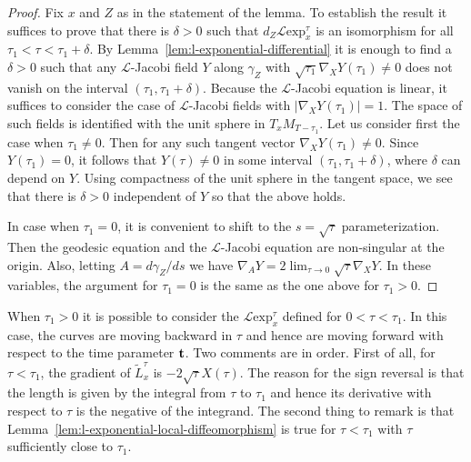 \begin{proof}
Fix $x$ and $Z$ as in the statement of the lemma. To establish the result it
suffices to prove that there is $\delta>0$ such that $d_Z{\mathcal L}\mathrm{exp}_x^{\tau}$ is an isomorphism for all $\tau_1<\tau<\tau_1+\delta$. By
Lemma~\ref{lem:l-exponential-differential} it is enough to find a $\delta>0$ such that any ${\mathcal
L}$-Jacobi field $Y$ along
 $\gamma_Z$ with $\sqrt{\tau_1}\nabla_XY(\tau_1)\not= 0$ does
 not vanish on the interval $(\tau_1,\tau_1+\delta)$.
 Because the ${\mathcal L}$-Jacobi equation is linear, it suffices to consider the
 case of ${\mathcal L}$-Jacobi fields with
 $|\nabla_XY(\tau_1)|=1$. The space of such fields is identified with the
 unit sphere in $T_xM_{T-\tau_1}$.
 Let us consider first the case when $\tau_1\not= 0$. Then for any
 such tangent vector $\nabla_XY(\tau_1)\not=0$. Since $Y(\tau_1)=0$,
 it follows that $Y(\tau)\not=0$ in some interval
 $(\tau_1,\tau_1+\delta)$, where $\delta$ can depend on $Y$.  Using
 compactness of the unit sphere in the tangent space, we see that there is $\delta>0$
 independent of $Y$ so that the above holds.

 In case when $\tau_1=0$, it is convenient to shift to the
 $s=\sqrt{\tau}$ parameterization. Then the geodesic equation and
 the ${\mathcal L}$-Jacobi equation are non-singular at the origin. Also, letting
 $A=d\gamma_Z/ds$ we have $\nabla_AY=2\lim_{\tau\rightarrow
 0}\sqrt{\tau}\nabla_XY$. In these variables, the argument for $\tau_1=0$
 is the same as the one above for $\tau_1>0$.
\end{proof}

\begin{remark}\label{rem:l-exponential-backward-tau}
\label{backwards}
When $\tau_1>0$ it is possible to consider the ${\mathcal L}\mathrm{exp}^{\tau}_x$ defined for $0<\tau<\tau_1$. In this case, the curves
are moving backward in $\tau$ and hence are moving forward with
respect to the time parameter ${\bf t}$. Two comments are in order.
First of all, for $\tau<\tau_1$, the gradient of ${\widetilde
L}^{\tau}_x$ is $-2\sqrt{\tau}X(\tau)$. The reason for the sign
reversal is that the length is given by the integral from $\tau$ to
$\tau_1$ and hence its derivative with respect to $\tau$ is the
negative of the integrand. The second thing to remark is that
Lemma~\ref{lem:l-exponential-local-diffeomorphism} is true for $\tau<\tau_1$ with $\tau$
sufficiently close to $\tau_1$.
\end{remark}

